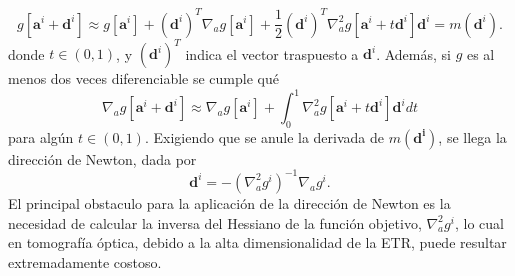 \begin{equation}
g[\mathbf{a}^i+ \mathbf{d}^i]\approx g[\mathbf{a}^i]+ (\mathbf{d}^i)^T \nabla_a g[\mathbf{a}^i]+\frac{1}{2}(\mathbf{d}^i)^T \nabla_a^2 g[\mathbf{a}^i+t\mathbf{d}^i] \mathbf{d}^i=m(\mathbf{d}^i).
\label{eq:Taylor}
\end{equation}
donde $t \in (0,1)$, y $(\mathbf{d}^i)^T$ indica el vector traspuesto a $\mathbf{d}^i$.
Además, si $g$ es al menos dos veces diferenciable se cumple qué 
\begin{equation}
\nabla_a g[\mathbf{a}^i+ \mathbf{d}^i]\approx \nabla_a g[\mathbf{a}^i]+\int_0^1\nabla_a^2 g[\mathbf{a}^i+t\mathbf{d}^i] \mathbf{d}^idt 
\label{eq:Taylor2}
\end{equation}
para algún $t \in (0,1)$.
Exigiendo que se anule la derivada de $m(\mathbf{d^i})$, se llega la dirección de Newton, dada por
\begin{equation}
\mathbf{d}^i=-(\nabla_a^2 g^i )^{-1} \nabla_a g^i.
\label{eq:direccion}
\end{equation}
El principal obstaculo para la aplicación de la dirección de Newton es la 
necesidad de calcular la inversa del Hessiano de la función objetivo, $\nabla_a^2 g^i$, 
lo cual en tomografía óptica, debido a la alta dimensionalidad de la ETR, puede 
resultar extremadamente costoso. 

